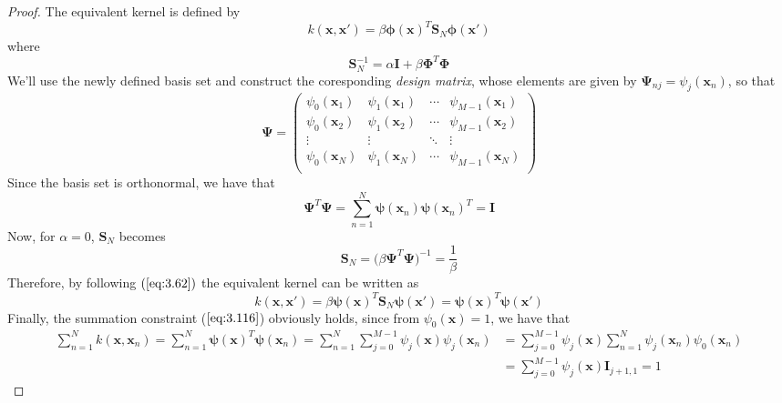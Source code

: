 \begin{proof}
    The equivalent kernel is defined by
    \begin{equation}\label{eq:3.62}\tag{3.62}
        k(\mathbf{x}, \mathbf{x'}) 
        = \beta \bm{\phi}(\mathbf{x})^T\mathbf{S}_N\bm{\phi}(\mathbf{x}')
    \end{equation}
    where 
    \begin{equation}\label{eq:3.54}\tag{3.54}
        \mathbf{S}_N^{-1} = \alpha\mathbf{I} + \beta\mathbf{\Phi}^T\mathbf{\Phi}
    \end{equation}
    We'll use the newly defined basis set and
    construct the coresponding \emph{design matrix},
    whose elements are given by $\mathbf{\Psi}_{nj} = \psi_j({\mathbf{x}_n})$,
    so that
    \[
        \mathbf{\Psi} =
        \begin{pmatrix}
            \psi_0(\mathbf{x}_1) & \psi_1(\mathbf{x}_1) & \cdots & \psi_{M - 1}(\mathbf{x}_1) \\
            \psi_0(\mathbf{x}_2) & \psi_1(\mathbf{x}_2) & \cdots & \psi_{M - 1}(\mathbf{x}_2) \\
            \vdots & \vdots & \ddots & \vdots \\
            \psi_0(\mathbf{x}_N) & \psi_1(\mathbf{x}_N) & \cdots & \psi_{M - 1}(\mathbf{x}_N) \\
        \end{pmatrix}
    \] 
    Since the basis set is orthonormal, we have that
     \[
         \mathbf{\Psi}^T \mathbf{\Psi} 
         = \sum_{n=1}^{N} \bm{\psi}(\mathbf{x}_n) \bm{\psi}(\mathbf{x}_n)^T 
         = \mathbf{I}
    \] 
    Now, for $\alpha = 0$, $\mathbf{S}_N$ becomes 
    \[
        \mathbf{S}_N = \big(\beta \mathbf{\Psi}^T \mathbf{\Psi}\big)^{-1} = \frac{1}{\beta}
    \] 
    Therefore, by following $(\ref{eq:3.62})$ the equivalent kernel can be written as
    \[
        k(\mathbf{x}, \mathbf{x'}) 
        = \beta \bm{\psi}(\mathbf{x})^T \mathbf{S}_N \bm{\psi}(\mathbf{x'})
        = \bm{\psi}(\mathbf{x})^T \bm{\psi}(\mathbf{x'})
    \] 
    Finally, the summation constraint ($\ref{eq:3.116}$) obviously holds, since
    from $\psi_0(\mathbf{x}) = 1$, we have that
    \begin{align*}
        \sum_{n=1}^{N} k(\mathbf{x}, \mathbf{x}_n) 
        = \sum_{n=1}^{N} \bm{\psi}(\mathbf{x})^T \bm{\psi}(\mathbf{x}_n)
        = \sum_{n=1}^{N} \sum_{j=0}^{M - 1} \psi_j(\mathbf{x}) \psi_j(\mathbf{x}_n)  
        &= \sum_{j=0}^{M - 1} \psi_j(\mathbf{x}) 
        \sum_{n=1}^{N} \psi_j(\mathbf{x}_n) \psi_0(\mathbf{x}_n) \\
        &= \sum_{j=0}^{M - 1} \psi_j(\mathbf{x}) \mathbf{I}_{j+1, 1} = 1
    \end{align*}
\end{proof}

